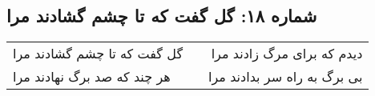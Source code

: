 \begin{center}
\section*{شماره ۱۸: گل گفت که تا چشم گشادند مرا}
\label{sec:018}
\begin{longtable}{l p{0.5cm} r}
گل گفت که تا چشم گشادند مرا
&&
دیدم که برای مرگ زادند مرا
\\
هر چند که صد برگ نهادند مرا
&&
بی برگ به راه سر بدادند مرا
\\
\end{longtable}
\end{center}
